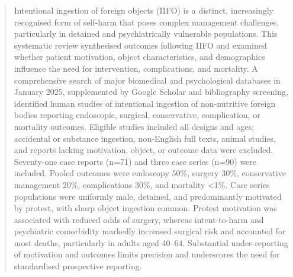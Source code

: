 \begin{abstract}
Intentional ingestion of foreign objects (IIFO) is a distinct, increasingly recognised form of self-harm that poses complex management challenges, particularly in detained and psychiatrically vulnerable populations. This systematic review synthesised outcomes following IIFO and examined whether patient motivation, object characteristics, and demographics influence the need for intervention, complications, and mortality. A comprehensive search of major biomedical and psychological databases in January 2025, supplemented by Google Scholar and bibliography screening, identified human studies of intentional ingestion of non-nutritive foreign bodies reporting endoscopic, surgical, conservative, complication, or mortality outcomes. Eligible studies included all designs and ages; accidental or substance ingestion, non-English full texts, animal studies, and reports lacking motivation, object, or outcome data were excluded. Seventy-one case reports (n=71) and three case series (n=90) were included. Pooled outcomes were endoscopy 50\%, surgery 30\%, conservative management 20\%, complications 30\%, and mortality <1\%. Case series populations were uniformly male, detained, and predominantly motivated by protest, with sharp object ingestion common. Protest motivation was associated with reduced odds of surgery, whereas intent-to-harm and psychiatric comorbidity markedly increased surgical risk and accounted for most deaths, particularly in adults aged 40–64. Substantial under-reporting of motivation and outcomes limits precision and underscores the need for standardised prospective reporting.
\end{abstract}